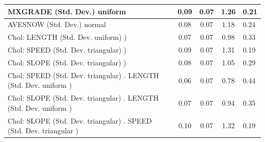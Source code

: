 \begin{table}
\begin{center}
\begin{tabular}{|l|l|c|c|c|l|}
			\hline
			MXGRADE (Std. Dev.) uniform &  & 0.09 & 0.07 & 1.26 & 0.21 \\
			\hline
			AVESNOW (Std. Dev.) normal &  & 0.08 & 0.07 & 1.18 & 0.24 \\
			\hline
			 Chol: LENGTH (Std. Dev. uniform) ) &  & 0.07 & 0.07 & 0.98 & 0.33 \\
			\hline
			 Chol: SPEED (Std. Dev. triangular) ) &  & 0.09 & 0.07 & 1.31 & 0.19 \\
			\hline
			 Chol: SLOPE (Std. Dev. triangular) ) &  & 0.08 & 0.07 & 1.05 & 0.29 \\
			\hline
			 Chol: SPEED (Std. Dev. triangular) . LENGTH (Std. Dev.   uniform ) &  & 0.06 & 0.07 & 0.78 & 0.44 \\
			\hline
			 Chol: SLOPE (Std. Dev. triangular) . LENGTH (Std. Dev.   uniform ) &  & 0.07 & 0.07 & 0.94 & 0.35 \\
			\hline
			 Chol: SLOPE (Std. Dev. triangular) . SPEED (Std. Dev.   triangular ) &  & 0.10 & 0.07 & 1.32 & 0.19 \\
			\hline
		\end{tabular}
	\end{center}
\end{table}